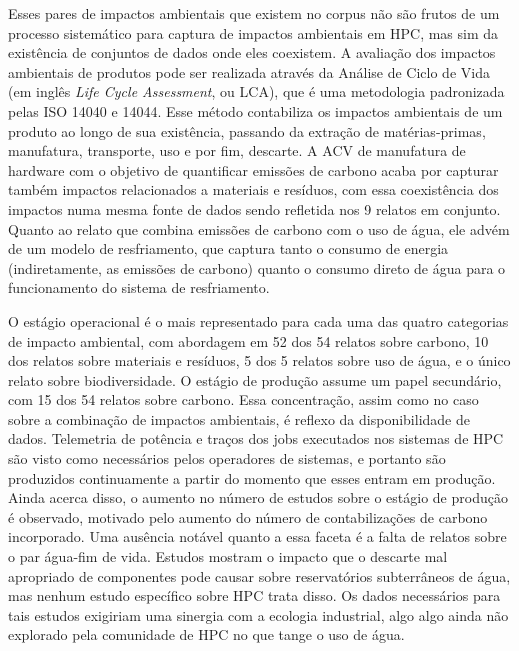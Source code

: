 Esses pares de impactos ambientais que existem no corpus não são frutos de um processo sistemático para captura
de impactos ambientais em HPC, mas sim da existência de conjuntos de dados onde eles coexistem. A avaliação dos 
impactos ambientais de produtos pode ser realizada através da Análise de Ciclo de Vida (em inglês 
\textit{Life Cycle Assessment}, ou LCA), que é uma metodologia padronizada pelas ISO 14040 e 14044.
Esse método contabiliza os impactos ambientais de um produto ao longo de sua existência, passando da
extração de matérias-primas, manufatura, transporte, uso e por fim, descarte. A ACV de manufatura de hardware
com o objetivo de quantificar emissões de carbono acaba por capturar também impactos relacionados a materiais
e resíduos, com essa coexistência dos impactos numa mesma fonte de dados sendo refletida nos 9 relatos em conjunto.
Quanto ao relato que combina emissões de carbono com o uso de água, ele advém de um modelo de resfriamento, que 
captura tanto o consumo de energia (indiretamente, as emissões de carbono) quanto o consumo direto de água para o funcionamento
do sistema de resfriamento.

O estágio operacional é o mais representado para cada uma das quatro categorias de impacto ambiental, 
com abordagem em 52 dos 54 relatos sobre carbono, 10 dos relatos sobre materiais e resíduos, 5 dos 5 relatos 
sobre uso de água, e o único relato sobre biodiversidade. O estágio de produção assume um papel secundário, 
com 15 dos 54 relatos sobre carbono. Essa concentração, assim como no caso sobre a combinação de impactos ambientais,
é reflexo da disponibilidade de dados. Telemetria de potência e traços dos jobs executados nos sistemas de HPC são 
visto como necessários pelos operadores de sistemas, e portanto são produzidos continuamente a partir do momento
que esses entram em produção. Ainda acerca disso, o aumento no número de estudos sobre o estágio de produção é observado,
motivado pelo aumento do número de contabilizações de carbono incorporado. Uma ausência notável quanto a essa
faceta é a falta de relatos sobre o par água-fim de vida. Estudos mostram o impacto que o descarte mal apropriado
de componentes pode causar sobre reservatórios subterrâneos de água, mas nenhum estudo específico sobre
HPC trata disso. Os dados necessários para tais estudos exigiriam uma sinergia com a ecologia industrial, algo
algo ainda não explorado pela comunidade de HPC no que tange o uso de água.

